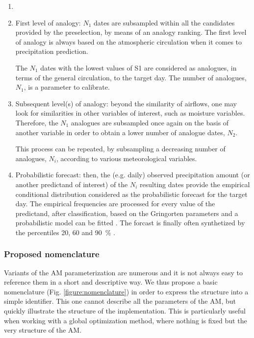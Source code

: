 \documentclass[review]{elsarticle}
\begin{document}
\begin{enumerate}
	\item 
	
	\item First level of analogy: $N_{1}$ dates are subsampled within all the candidates provided by the preselection, by means of an analogy ranking. The first level of analogy is always based on the atmospheric circulation when it comes to precipitation prediction. 
	
	The $N_{1}$ dates with the lowest values of S1 are considered as analogues, in terms of the general circulation, to the target day. The number of analogues, $N_{1}$, is a parameter to calibrate.
	
	\item Subsequent level(s) of analogy: beyond the similarity of airflows, one may look for similarities in other variables of interest, such as moisture variables. Therefore, the $N_{1}$ analogues are subsampled once again on the basis of another variable in order to obtain a lower number of analogue dates, $N_{2}$. 
	
	This process can be repeated, by subsampling a decreasing number of analogues, $N_{i}$, according to various meteorological variables.
	
	\item Probabilistic forecast: then, the (e.g. daily) observed precipitation amount (or another predictand of interest) of the $N_{i}$ resulting dates provide the empirical conditional distribution considered as the probabilistic forecast for the target day. The empirical frequencies are processed for every value of the predictand, after classification, based on the Gringorten parameters \cite[for a Gumbel or exponential law; see][]{Gringorten1963} and a probabilistic model can be fitted \citep[e.g. Gamma function,][]{Obled2002}. The forcast is finally often synthetized by the percentiles 20, 60 and 90~\% \citep{Guilbaud1997, Guilbaud1998}.
	
\end{enumerate}


\subsubsection{Proposed nomenclature}

Variants of the AM parameterization are numerous and it is not always easy to reference them in a short and descriptive way. We thus propose a basic nomenclature (Fig. \ref{figure:nomenclature}) in order to express the structure into a simple identifier. This one cannot describe all the parameters of the AM, but quickly illustrate the structure of the implementation. This is particularly useful when working with a global optimization method, where nothing is fixed but the very structure of the AM.
\end{document}
